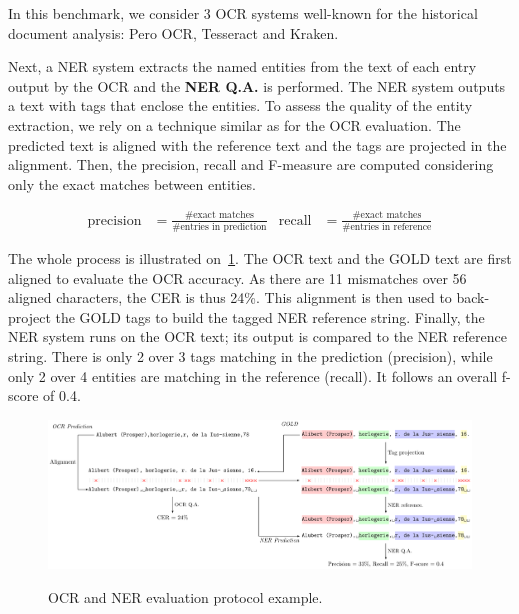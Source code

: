 In this benchmark, we consider 3 OCR systems well-known for the historical document analysis: Pero OCR, Tesseract and Kraken. 



Next, a NER system extracts the named entities from the text of each entry output by the OCR and the \textbf{NER Q.A.}
is performed. The NER system outputs a text with tags that enclose the entities. To assess the quality of the entity
extraction, we rely on a technique similar as for the OCR evaluation. The predicted text is aligned with the reference
text and the tags are projected in the alignment. Then, the precision, recall and F-measure are computed considering
only the exact matches between entities.

\begin{align}
    \mathrm{precision} &= \frac{\text{\#exact matches}}{\text{\#entries in prediction}} & \mathrm{recall} &= \frac{\text{\#exact matches}}{\text{\#entries in reference}}
\end{align}


The whole process is illustrated on~\cref{fig.eval-ocr-ner}. The OCR text and the GOLD text are first aligned to
evaluate the OCR accuracy. As there are 11 mismatches over 56 aligned characters, the CER is thus 24\%. This alignment
is then used to back-project the GOLD tags to build the tagged NER reference string. Finally, the NER system runs on the
OCR text; its output is compared to the NER reference string. There is only 2 over 3 tags matching in the prediction (precision),
while only 2 over 4 entities are matching in the reference (recall). It follows an overall f-score of 0.4.


\begin{figure}[tb]
    \includegraphics[width=\linewidth]{figs/eval-ocr-ner.pdf}
    \label{fig.eval-ocr-ner}
    \caption{OCR and NER evaluation protocol example.}
\end{figure}





